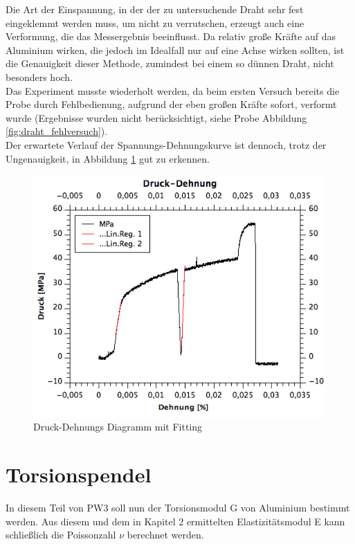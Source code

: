 \documentclass[12pt,a4paper]{article}
\begin{document}
\begin{multicols}{2}
Die Art der Einspannung, in der der zu untersuchende Draht sehr fest eingeklemmt werden muss, um nicht zu verrutschen, erzeugt auch eine Verformung, die das Messergebnis beeinflusst. Da relativ große Kräfte auf das Aluminium wirken, die jedoch im Idealfall nur auf eine Achse wirken sollten, ist die Genauigkeit dieser Methode, zumindest bei einem so dünnen Draht, nicht besonders hoch.\\
Das Experiment musste wiederholt werden, da beim ersten Versuch bereits die Probe durch Fehlbedienung, aufgrund der eben großen Kräfte sofort, verformt wurde (Ergebnisse wurden nicht berücksichtigt, siehe Probe Abbildung \ref{fig:draht_fehlversuch}).\\
Der erwartete Verlauf der Spannungs-Dehnungskurve ist dennoch, trotz der Ungenauigkeit, in Abbildung \ref{fig:draht_druck_dehnung_linreg} gut zu erkennen.

\begin{figure}[H]
	\centering
  	\includegraphics[scale=0.4]{./figure/druck_dehnung_linreg.png}
	\caption{Druck-Dehnungs Diagramm mit Fitting}
	\label{fig:draht_druck_dehnung_linreg}
\end{figure}

\section{Torsionspendel}
In diesem Teil von PW3 soll nun der Torsionsmodul G von Aluminium bestimmt werden. Aus diesem und dem in Kapitel 2 ermittelten Elastizitätsmodul E kann schließlich die Poissonzahl $\nu $ berechnet werden.\\


\end{multicols}
\end{document}
